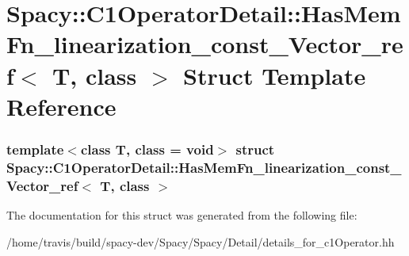 \hypertarget{structSpacy_1_1C1OperatorDetail_1_1HasMemFn__linearization__const__Vector__ref}{\section{\-Spacy\-:\-:\-C1\-Operator\-Detail\-:\-:\-Has\-Mem\-Fn\-\_\-linearization\-\_\-const\-\_\-\-Vector\-\_\-ref$<$ \-T, class $>$ \-Struct \-Template \-Reference}
\label{structSpacy_1_1C1OperatorDetail_1_1HasMemFn__linearization__const__Vector__ref}
}
\subsubsection*{template$<$class T, class = void$>$ struct Spacy\-::\-C1\-Operator\-Detail\-::\-Has\-Mem\-Fn\-\_\-linearization\-\_\-const\-\_\-\-Vector\-\_\-ref$<$ T, class $>$}



\-The documentation for this struct was generated from the following file\-:\begin{DoxyCompactItemize}
\item 
/home/travis/build/spacy-\/dev/\-Spacy/\-Spacy/\-Detail/details\-\_\-for\-\_\-c1\-Operator.\-hh\end{DoxyCompactItemize}
